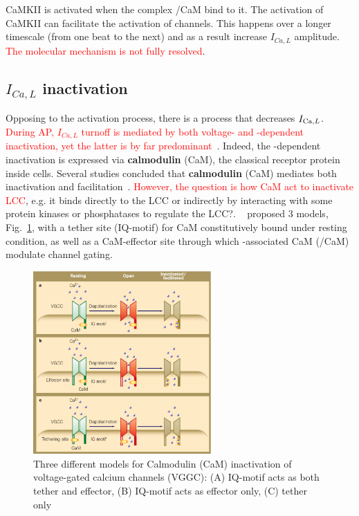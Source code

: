 CaMKII is activated when the complex /CaM bind to it. The activation
of CaMKII can facilitate the activation of  channels. This happens
over a longer timescale (from one beat to the next) and as a result increase
$I_{Ca,L}$ amplitude.
\textcolor{red}{The molecular mechanism is not fully resolved}.


\subsection{$I_{Ca,L}$ inactivation}
\label{sec:calcium-inactivation}

Opposing to the activation process, there is a process that decreases
$I_{\ce{Ca},L}$.
\textcolor{red}{During AP, $I_{Ca,L}$ turnoff is mediated by both
  voltage- and -dependent inactivation, yet the latter is by
  far predominant}~\citep{bers2001ecc}.
Indeed, the -dependent inactivation is expressed via
{\bf calmodulin} (CaM), the classical  receptor protein
inside cells. Several studies concluded that {\bf calmodulin} (CaM)
mediates both inactivation and
facilitation~\citep{lee1999calm, zuhlke1999calm}.
\textcolor{red}{However, the question is how CaM act to inactivate
  LCC},
e.g. it binds directly to the LCC or indirectly by interacting with
some protein kinases or phosphatases to regulate the LCC?.
~\citep{ehlers1999calm} proposed 3 models,
Fig.~\ref{fig:calmodulin_hyp}, with a tether site (IQ-motif) for CaM
constitutively bound under resting condition, as well as a
CaM-effector site through which -associated CaM
(/CaM) modulate channel gating.

\begin{figure}[hbt]
  \centerline{\includegraphics[height=7cm,
    angle=0]{./images/calmodulin_inactivation.eps}}
  \caption{Three different models for Calmodulin (CaM) inactivation of
    voltage-gated calcium channels (VGGC): (A) IQ-motif acts as both
    tether and effector, (B) IQ-motif acts as effector only, (C) tether only}
  \label{fig:calmodulin_hyp}
\end{figure}

